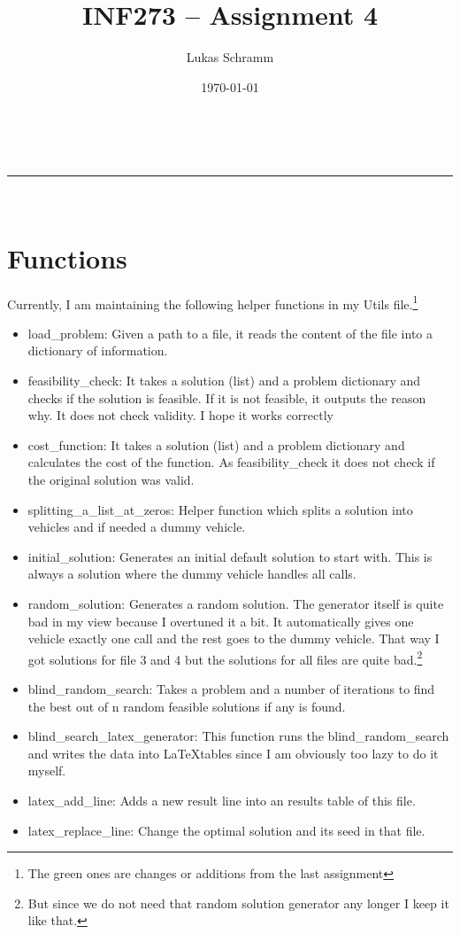 \documentclass[a4paper,11pt]{article}
\makeatletter
\newcommand{\linia}{\rule{\linewidth}{0.5pt}}
\theoremstyle{mytheor}
\renewcommand{\maketitle}{
\begin{center}
\vspace{2ex}
{\huge \textsc{\@title}}
\vspace{1ex}
\\
\linia\\
\@author \hfill \@date
\vspace{4ex}
\end{center}
}
\makeatother
\begin{document}
\title{INF273 – Assignment 4}

\author{Lukas Schramm}

\date{\today}

\maketitle

\section{Functions}
Currently, I am maintaining the following helper functions in my Utils file.\footnote{The green ones are changes or additions from the last assignment}
\begin{itemize}
\item load\_problem: Given a path to a file, it reads the content of the file into a dictionary of information.
\item feasibility\_check: It takes a solution (list) and a problem dictionary and checks if the solution is feasible. If it is not feasible, it outputs the reason why. It does not check validity. I hope it works correctly
\item cost\_function: It takes a solution (list) and a problem dictionary and calculates the cost of the function. As feasibility\_check it does not check if the original solution was valid.
\item splitting\_a\_list\_at\_zeros: Helper function which splits a solution into vehicles and if needed a dummy vehicle.
\item initial\_solution: Generates an initial default solution to start with. This is always a solution where the dummy vehicle handles all calls.

\item random\_solution: Generates a random solution. The generator itself is quite bad in my view because I overtuned it a bit. It automatically gives one vehicle exactly one call and the rest goes to the dummy vehicle. That way I got solutions for file 3 and 4 but the solutions for all files are quite bad.\footnote{But since we do not need that random solution generator any longer I keep it like that.}
\item blind\_random\_search: Takes a problem and a number of iterations to find the best out of n random feasible solutions if any is found.
\item blind\_search\_latex\_generator: This function runs the blind\_random\_search and writes the data into \LaTeX tables since I am obviously too lazy to do it myself.
\item latex\_add\_line: Adds a new result line into an results table of this file.
\item latex\_replace\_line: Change the optimal solution and its seed in that file.


\end{itemize}
\end{document}
